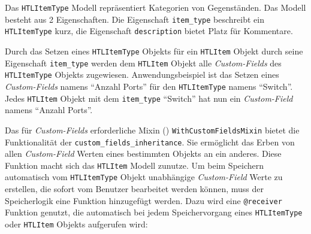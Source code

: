 Das \texttt{HTLItemType} Modell repräsentiert Kategorien von
Gegenständen. Das Modell besteht aus 2 Eigenschaften. Die Eigenschaft
\texttt{item\_type} beschreibt ein \texttt{HTLItemType} kurz, die
Eigenschaft \texttt{description} bietet Platz für Kommentare.

Durch das Setzen eines \texttt{HTLItemType} Objekts für ein
\texttt{HTLItem} Objekt durch seine Eigenschaft \texttt{item\_type}
werden dem \texttt{HTLItem} Objekt alle
\emph{Custom-Fields}
des \texttt{HTLItemType} Objekts zugewiesen. Anwendungsbeispiel ist das
Setzen eines
\emph{Custom-Fields}
namens ``Anzahl Ports'' für den \texttt{HTLItemType} namens ``Switch''.
Jedes \texttt{HTLItem} Objekt mit dem \texttt{item\_type} ``Switch'' hat
nun ein \emph{Custom-Field} namens ``Anzahl Ports''.

Das für
\emph{Custom-Fields}
erforderliche Mixin ()
\texttt{WithCustomFieldsMixin} bietet die Funktionalität der
\texttt{custom\_fields\_inheritance}. Sie ermöglicht das Erben von allen
\emph{Custom-Field} Werten eines bestimmten Objekts an ein anderes.
Diese Funktion macht sich das \texttt{HTLItem} Modell zunutze. Um beim
Speichern automatisch vom \texttt{HTLItemType} Objekt unabhängige
\emph{Custom-Field} Werte zu erstellen, die sofort vom Benutzer
bearbeitet werden können, muss der Speicherlogik eine Funktion
hinzugefügt werden. Dazu wird eine \texttt{@receiver} Funktion genutzt,
die automatisch bei jedem Speichervorgang eines \texttt{HTLItemType}
oder \texttt{HTLItem} Objekts aufgerufen wird:

\begin{Shaded}
\begin{Highlighting}[]
\OperatorTok{=}
\OperatorTok{**}
    
\OperatorTok{=}
\OperatorTok{**}
\end{Highlighting}
\end{Shaded}

